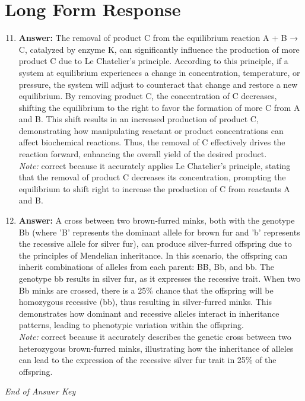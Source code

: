 \documentclass[12pt]{article}
\begin{document}
\section*{Long Form Response}
\begin{enumerate}[label=\arabic*.]
\setcounter{enumi}{10}
\item \textbf{Answer:} The removal of product C from the equilibrium reaction A + B → C, catalyzed by enzyme K, can significantly influence the production of more product C due to Le Chatelier's principle. According to this principle, if a system at equilibrium experiences a change in concentration, temperature, or pressure, the system will adjust to counteract that change and restore a new equilibrium. By removing product C, the concentration of C decreases, shifting the equilibrium to the right to favor the formation of more C from A and B. This shift results in an increased production of product C, demonstrating how manipulating reactant or product concentrations can affect biochemical reactions. Thus, the removal of C effectively drives the reaction forward, enhancing the overall yield of the desired product.
\\ \textit{Note:} correct because it accurately applies Le Chatelier's principle, stating that the removal of product C decreases its concentration, prompting the equilibrium to shift right to increase the production of C from reactants A and B.
\item \textbf{Answer:} A cross between two brown-furred minks, both with the genotype Bb (where 'B' represents the dominant allele for brown fur and 'b' represents the recessive allele for silver fur), can produce silver-furred offspring due to the principles of Mendelian inheritance. In this scenario, the offspring can inherit combinations of alleles from each parent: BB, Bb, and bb. The genotype bb results in silver fur, as it expresses the recessive trait. When two Bb minks are crossed, there is a 25\% chance that the offspring will be homozygous recessive (bb), thus resulting in silver-furred minks. This demonstrates how dominant and recessive alleles interact in inheritance patterns, leading to phenotypic variation within the offspring.
\\ \textit{Note:} correct because it accurately describes the genetic cross between two heterozygous brown-furred minks, illustrating how the inheritance of alleles can lead to the expression of the recessive silver fur trait in 25\% of the offspring.
\end{enumerate}

\vfill
\noindent\textit{End of Answer Key}
\end{document}
